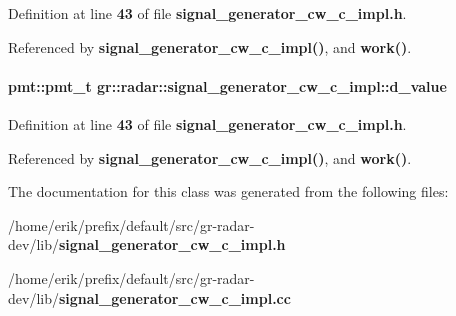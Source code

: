 Definition at line {\bf 43} of file {\bf signal\+\_\+generator\+\_\+cw\+\_\+c\+\_\+impl.\+h}.



Referenced by {\bf signal\+\_\+generator\+\_\+cw\+\_\+c\+\_\+impl()}, and {\bf work()}.

\paragraph[{d\+\_\+value}]{\setlength{\rightskip}{0pt plus 5cm}pmt\+::pmt\+\_\+t gr\+::radar\+::signal\+\_\+generator\+\_\+cw\+\_\+c\+\_\+impl\+::d\+\_\+value}\label{classgr_1_1radar_1_1signal__generator__cw__c__impl_a995bad36100e6151ff00f8cbc3c5de37}


Definition at line {\bf 43} of file {\bf signal\+\_\+generator\+\_\+cw\+\_\+c\+\_\+impl.\+h}.



Referenced by {\bf signal\+\_\+generator\+\_\+cw\+\_\+c\+\_\+impl()}, and {\bf work()}.



The documentation for this class was generated from the following files\+:\begin{DoxyCompactItemize}
\item 
/home/erik/prefix/default/src/gr-\/radar-\/dev/lib/{\bf signal\+\_\+generator\+\_\+cw\+\_\+c\+\_\+impl.\+h}\item 
/home/erik/prefix/default/src/gr-\/radar-\/dev/lib/{\bf signal\+\_\+generator\+\_\+cw\+\_\+c\+\_\+impl.\+cc}\end{DoxyCompactItemize}
